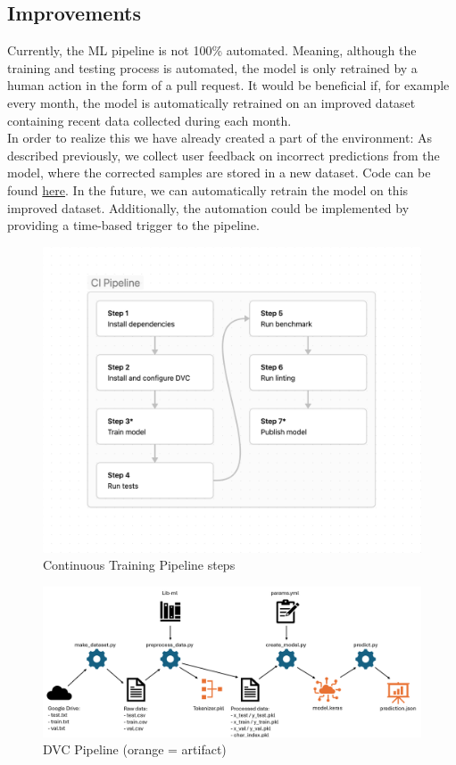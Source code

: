 \subsection{Improvements}
Currently, the ML pipeline is not 100\% automated. Meaning, although the training and testing process is automated, the model is only retrained by a human action in the form of a pull request. 
It would be beneficial if, for example every month, the model is automatically retrained on an improved dataset containing recent data collected during each month. \\
In order to realize this we have already created a part of the environment: As described previously, we collect user feedback on incorrect predictions from the model, where the corrected samples are stored in a new dataset. Code can be found {\color{blue} \href{https://github.com/remla24-team12/model-service/blob/main/src/app.py}{here}}. In the future, we can automatically retrain the model on this improved dataset. Additionally, the automation could be implemented by providing a time-based trigger to the pipeline. 

\begin{figure}[H]
    \centering
    \includegraphics[width=\linewidth]{images/ci_pipeline.png}
    \caption{Continuous Training Pipeline steps}
    \label{fig:ci-pipeline}
\end{figure}

\begin{figure}[h]
    \centering
    \includegraphics[width=1\linewidth]{images/ml_pipeline.png}
    \caption{DVC Pipeline (orange = artifact)}
    \label{fig:ml-pipeline}
\end{figure}
